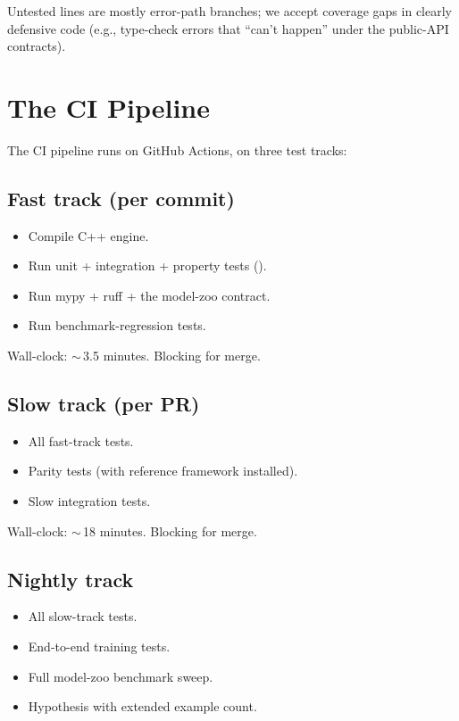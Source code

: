 Untested lines are mostly error-path branches; we accept
coverage gaps in clearly defensive code (e.g., type-check
errors that ``can't happen'' under the public-API contracts).

\section{The CI Pipeline}
\label{sec:testing:ci_pipeline}

The CI pipeline runs on GitHub Actions, on three test tracks:

\subsection{Fast track (per commit)}
\label{ssec:testing:fast_track}

\begin{itemize}
  \item Compile C++ engine.
  \item Run unit + integration + property tests
    ().
  \item Run mypy + ruff + the model-zoo contract.
  \item Run benchmark-regression tests.
\end{itemize}

Wall-clock: $\sim$\,3.5 minutes. Blocking for merge.

\subsection{Slow track (per PR)}
\label{ssec:testing:slow_track}

\begin{itemize}
  \item All fast-track tests.
  \item Parity tests (with reference framework installed).
  \item Slow integration tests.
\end{itemize}

Wall-clock: $\sim$\,18 minutes. Blocking for merge.

\subsection{Nightly track}
\label{ssec:testing:nightly_track}

\begin{itemize}
  \item All slow-track tests.
  \item End-to-end training tests.
  \item Full model-zoo benchmark sweep.
  \item Hypothesis with extended example count.
\end{itemize}

